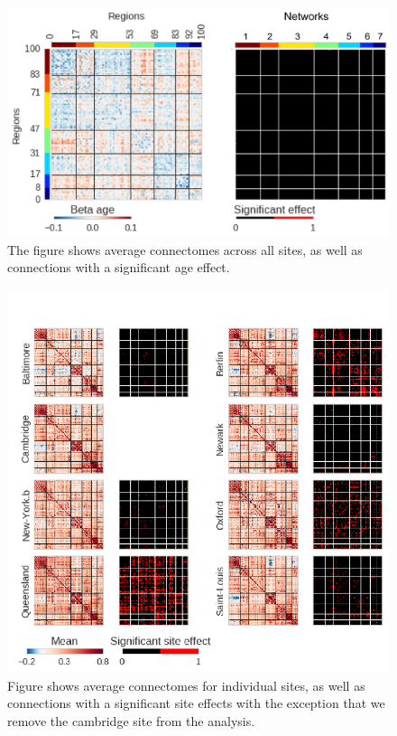 \documentclass[authoryear]{elsarticle}
\begin{document}
\begin{figure}[htbp]
\begin{center}
\includegraphics[width=\linewidth]{../figures/effect_age.png}
\end{center}
\caption[Connectome variability across sites]{
The figure shows average connectomes across all sites, as well as connections with a significant age effect.
}
\label{fig_connectome_variability_age}
\end{figure}

\begin{figure}[htbp]
\begin{center}
\includegraphics[width=\linewidth]{../figures/connectome_multisite_no_cambridge.png}
\end{center}
\caption[]{
Figure shows average connectomes for individual sites, as well as connections with a significant site effects with the exception that we remove the cambridge site from the analysis.
}
\label{fig_connectome_variability_no_cambridge}
\end{figure}
\end{document}
